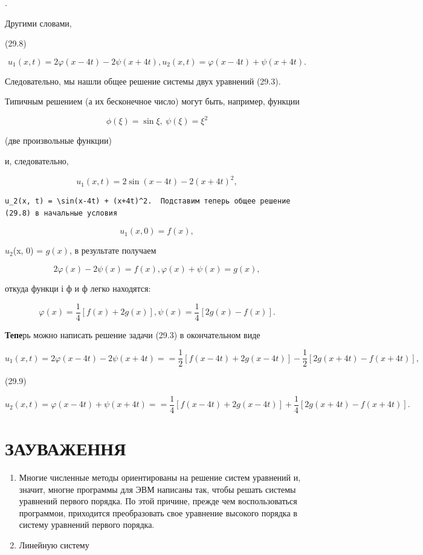 \documentclass[
  ukrainian,
]{article}
\begin{document}
.

Другими словами,

(29.8)

\[
u_1(x, t) = 2\varphi(x-4t) - 2\psi(x+4t), u_2(x, t) = \varphi(x-4t) + \psi(x+4t).
\]

Следовательно, мы нашли общее решение системы двух уравнений (29.3).

Типичным решением (а их бесконечное число) могут быть, например, функции

\[
\phi(\xi) = \sin \xi, \ \psi(\xi) = \xi^2
\]

(две произвольные функции)

и, следовательно,

\[
u_1(x, t) = 2 \sin(x-4t) - 2(x+4t)^2,
\]

\begin{verbatim}
u_2(x, t) = \sin(x-4t) + (x+4t)^2.  Подставим теперь общее решение (29.8) в начальные условия
\end{verbatim}

\[
u_1(x, 0) = f(x),
\]

\(u_2\)(x, 0) = \(g(x)\), в результате получаем

\[
2\varphi(x) - 2\psi(x) = f(x),
\varphi(x) + \psi(x) = g(x),
\]

откуда функци і ф и ф легко находятся:

\[
\varphi(x) = \frac{1}{4} \left[ f(x) + 2g(x) \right],
\psi(x) = \frac{1}{4} \left[ 2g(x) - f(x) \right].
\]

\textbf{Тепе}рь можно написать решение задачи (29.3) в окончательном
виде

\[
u_{1}(x, t) = 2\varphi(x-4t) - 2\psi(x+4t) =
= \frac{1}{2} \left[ f(x-4t) + 2g(x-4t) \right] - \frac{1}{2} \left[ 2g(x+4t) - f(x+4t) \right],
\]

(29.9)

\[
u_{2}(x, t) = \varphi(x-4t) + \psi(x+4t) =
= \frac{1}{4} \left[ f(x-4t) + 2g(x-4t) \right] + \frac{1}{4} \left[ 2g(x+4t) - f(x+4t) \right].
\]

\section{ЗАУВАЖЕННЯ}\label{ux437ux430ux443ux432ux430ux436ux435ux43dux43dux44f-12}

\begin{enumerate}
\def\labelenumi{\arabic{enumi}.}
\item
  Многие численные методы ориентированы на решение систем уравнений и,
  значит, многне программы для ЭВМ написаны так, чтобы решать системы
  уравнений первого порядка. По этой причине, прежде чем воспользоваться
  программои, приходится преобразовать свое уравнение высокого порядка в
  систему уравнений первого порядка.
\item
  Линейную систему
\end{enumerate}
\end{document}
